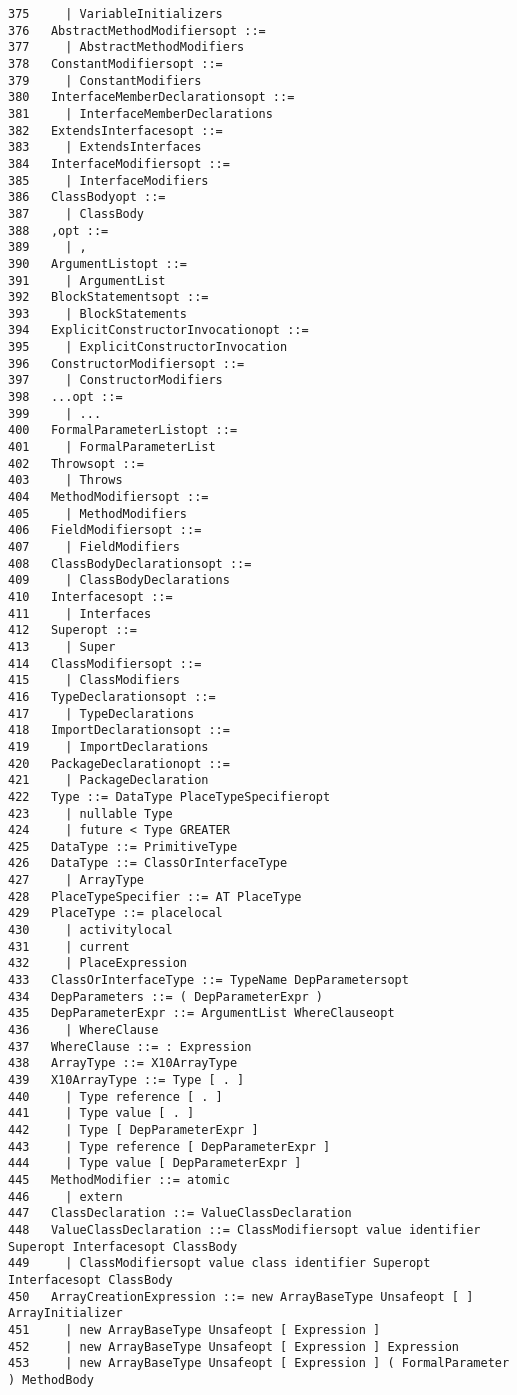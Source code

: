 \begin{verbatim}
375     | VariableInitializers
376   AbstractMethodModifiersopt ::=
377     | AbstractMethodModifiers
378   ConstantModifiersopt ::=
379     | ConstantModifiers
380   InterfaceMemberDeclarationsopt ::=
381     | InterfaceMemberDeclarations
382   ExtendsInterfacesopt ::=
383     | ExtendsInterfaces
384   InterfaceModifiersopt ::=
385     | InterfaceModifiers
386   ClassBodyopt ::=
387     | ClassBody
388   ,opt ::=
389     | ,
390   ArgumentListopt ::=
391     | ArgumentList
392   BlockStatementsopt ::=
393     | BlockStatements
394   ExplicitConstructorInvocationopt ::=
395     | ExplicitConstructorInvocation
396   ConstructorModifiersopt ::=
397     | ConstructorModifiers
398   ...opt ::=
399     | ...
400   FormalParameterListopt ::=
401     | FormalParameterList
402   Throwsopt ::=
403     | Throws
404   MethodModifiersopt ::=
405     | MethodModifiers
406   FieldModifiersopt ::=
407     | FieldModifiers
408   ClassBodyDeclarationsopt ::=
409     | ClassBodyDeclarations
410   Interfacesopt ::=
411     | Interfaces
412   Superopt ::=
413     | Super
414   ClassModifiersopt ::=
415     | ClassModifiers
416   TypeDeclarationsopt ::=
417     | TypeDeclarations
418   ImportDeclarationsopt ::=
419     | ImportDeclarations
420   PackageDeclarationopt ::=
421     | PackageDeclaration
422   Type ::= DataType PlaceTypeSpecifieropt
423     | nullable Type
424     | future < Type GREATER
425   DataType ::= PrimitiveType
426   DataType ::= ClassOrInterfaceType
427     | ArrayType
428   PlaceTypeSpecifier ::= AT PlaceType
429   PlaceType ::= placelocal
430     | activitylocal
431     | current
432     | PlaceExpression
433   ClassOrInterfaceType ::= TypeName DepParametersopt
434   DepParameters ::= ( DepParameterExpr )
435   DepParameterExpr ::= ArgumentList WhereClauseopt
436     | WhereClause
437   WhereClause ::= : Expression
438   ArrayType ::= X10ArrayType
439   X10ArrayType ::= Type [ . ]
440     | Type reference [ . ]
441     | Type value [ . ]
442     | Type [ DepParameterExpr ]
443     | Type reference [ DepParameterExpr ]
444     | Type value [ DepParameterExpr ]
445   MethodModifier ::= atomic
446     | extern
447   ClassDeclaration ::= ValueClassDeclaration
448   ValueClassDeclaration ::= ClassModifiersopt value identifier Superopt Interfacesopt ClassBody
449     | ClassModifiersopt value class identifier Superopt Interfacesopt ClassBody
450   ArrayCreationExpression ::= new ArrayBaseType Unsafeopt [ ] ArrayInitializer
451     | new ArrayBaseType Unsafeopt [ Expression ]
452     | new ArrayBaseType Unsafeopt [ Expression ] Expression
453     | new ArrayBaseType Unsafeopt [ Expression ] ( FormalParameter ) MethodBody

\end{verbatim}
